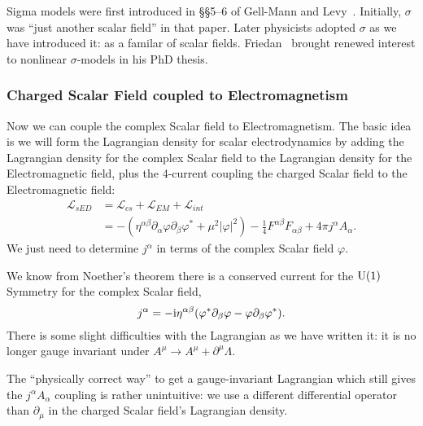 \begin{remark}
Sigma models were first introduced in \S\S5--6 of Gell-Mann and Levy~\cite{Gell-Mann:1960mvl}.
Initially, $\sigma$ was ``just another scalar field'' in that paper. Later
physicists adopted $\sigma$ as we have introduced it: as a familar of
scalar fields. Friedan~\cite{Friedan:1980jm} brought renewed interest to
nonlinear $\sigma$-models in his PhD thesis.
\end{remark}

\subsubsection{Charged Scalar Field coupled to Electromagnetism}

\M
Now we can couple the complex Scalar field to Electromagnetism.
The basic idea is we will form the Lagrangian density for scalar
electrodynamics by adding the Lagrangian density for the complex Scalar
field to the Lagrangian density for the Electromagnetic field, plus the
4-current coupling the charged Scalar field to the Electromagnetic field:
\begin{equation}
\begin{split}
\mathcal{L}_{sED}&=\mathcal{L}_{cs}+\mathcal{L}_{EM}+\mathcal{L}_{int}\\
&=-(\eta^{\alpha\beta}\partial_{\alpha}\varphi\partial_{\beta}\varphi^{*}+\mu^{2}|\varphi|^{2})
-\frac{1}{4}F^{\alpha\beta}F_{\alpha\beta}
+4\pi j^{\alpha}A_{\alpha}.
\end{split}
\end{equation}
We just need to determine $j^{\alpha}$ in terms of the complex Scalar
field $\varphi$.

We know from Noether's theorem there is a conserved current for the
$\operatorname{U}(1)$ Symmetry for the complex Scalar field,
\begin{equation}
j^{\alpha} = -\mathrm{i}\eta^{\alpha\beta}(\varphi^{*}\partial_{\beta}\varphi - \varphi\partial_{\beta}\varphi^{*}).
\end{equation}
There is some slight difficulties with the Lagrangian as we have written
it: it is no longer gauge invariant under $A^{\mu}\to
A^{\mu}+\partial^{\mu}\Lambda$.

The ``physically correct way'' to get a gauge-invariant Lagrangian which
still gives the $j^{\alpha}A_{\alpha}$ coupling is rather unintuitive:
we use a different differential operator than $\partial_{\mu}$ in the
charged Scalar field's Lagrangian density.

